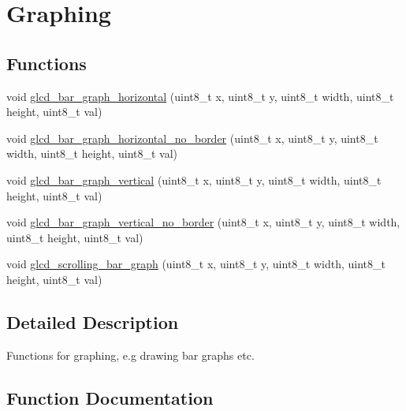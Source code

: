 \hypertarget{group___graphing}{}\section{Graphing}
\label{group___graphing}
\subsection*{Functions}
\begin{DoxyCompactItemize}
\item 
void \hyperlink{group___graphing_ga7a09cd72618dd5d5619b6aaf6597a17f}{glcd\+\_\+bar\+\_\+graph\+\_\+horizontal} (uint8\+\_\+t x, uint8\+\_\+t y, uint8\+\_\+t width, uint8\+\_\+t height, uint8\+\_\+t val)
\item 
void \hyperlink{group___graphing_ga1c4f2a2aa9c3d9710771d398d3cecb85}{glcd\+\_\+bar\+\_\+graph\+\_\+horizontal\+\_\+no\+\_\+border} (uint8\+\_\+t x, uint8\+\_\+t y, uint8\+\_\+t width, uint8\+\_\+t height, uint8\+\_\+t val)
\item 
void \hyperlink{group___graphing_gaadb6b8fa919155663d6261e9bf7c6c3a}{glcd\+\_\+bar\+\_\+graph\+\_\+vertical} (uint8\+\_\+t x, uint8\+\_\+t y, uint8\+\_\+t width, uint8\+\_\+t height, uint8\+\_\+t val)
\item 
void \hyperlink{group___graphing_ga96387c9e9bb6c8212c6bcd55c78d35b1}{glcd\+\_\+bar\+\_\+graph\+\_\+vertical\+\_\+no\+\_\+border} (uint8\+\_\+t x, uint8\+\_\+t y, uint8\+\_\+t width, uint8\+\_\+t height, uint8\+\_\+t val)
\item 
void \hyperlink{group___graphing_ga63f7a032ec9909b00d885e110dfc3845}{glcd\+\_\+scrolling\+\_\+bar\+\_\+graph} (uint8\+\_\+t x, uint8\+\_\+t y, uint8\+\_\+t width, uint8\+\_\+t height, uint8\+\_\+t val)
\end{DoxyCompactItemize}


\subsection{Detailed Description}
Functions for graphing, e.\+g drawing bar graphs etc. 

\subsection{Function Documentation}
\hypertarget{group___graphing_ga7a09cd72618dd5d5619b6aaf6597a17f}{}

